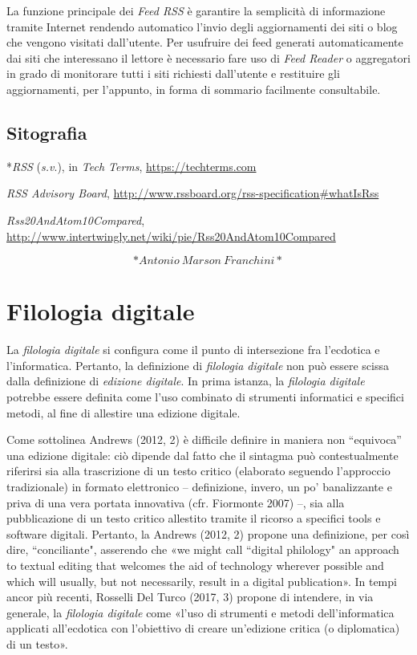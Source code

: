 \documentclass[
  b5paper,
  twoside,
  12pt,
  chapterprefix=false,
  bibliography=totocnumbered,
  parskip=false]{scrbook}
\begin{document}
La funzione principale dei \emph{Feed RSS} è garantire la semplicità di
informazione tramite Internet rendendo automatico l'invio degli
aggiornamenti dei siti o blog che vengono visitati dall'utente. Per
usufruire dei feed generati automaticamente dai siti che interessano il
lettore è necessario fare uso di \emph{Feed Reader} o aggregatori in grado di
monitorare tutti i siti richiesti dall'utente e restituire gli
aggiornamenti, per l'appunto, in forma di sommario facilmente
consultabile.

\hypertarget{sitografia-12}{%
\section*{Sitografia}\label{sitografia-12}}

*\emph{RSS} (\emph{s.v}.), in \emph{Tech Terms},
\url{https://techterms.com}

\emph{RSS Advisory Board},
\url{http://www.rssboard.org/rss-specification\#whatIsRss}

\emph{Rss20AndAtom10Compared},
\url{http://www.intertwingly.net/wiki/pie/Rss20AndAtom10Compared}

\[*Antonio~Marson~Franchini*\]

\hypertarget{filologia-digitale}{%
\chapter{Filologia digitale}\label{filologia-digitale}}

La \emph{filologia} \emph{digitale} si configura come il punto di intersezione fra
l'ecdotica e l'informatica. Pertanto, la definizione di \emph{filologia
digitale} non può essere scissa dalla definizione di \emph{edizione
digitale}. In prima istanza, la \emph{filologia digitale} potrebbe essere
definita come l'uso combinato di strumenti informatici e specifici
metodi, al fine di allestire una edizione digitale.

Come sottolinea Andrews (2012, 2) è difficile definire in maniera non
\enquote{equivoca} una edizione digitale: ciò dipende dal fatto che il sintagma
può contestualmente riferirsi sia alla trascrizione di un testo critico
(elaborato seguendo l'approccio tradizionale) in formato elettronico --
definizione, invero, un po' banalizzante e priva di una vera portata
innovativa (cfr. Fiormonte 2007) --, sia alla pubblicazione di un testo
critico allestito tramite il ricorso a specifici tools e software
digitali. Pertanto, la Andrews (2012, 2) propone una definizione, per
così dire, ``conciliante", asserendo che «we might call ``digital
philology" an approach to textual editing that welcomes the aid of
technology wherever possible and which will usually, but not
necessarily, result in a digital publication». In tempi ancor più
recenti, Rosselli Del Turco (2017, 3) propone di intendere, in via
generale, la \emph{filologia digitale} come «l'uso di strumenti e metodi
dell'informatica applicati all'ecdotica con l'obiettivo di creare
un'edizione critica (o diplomatica) di un testo».
\end{document}
